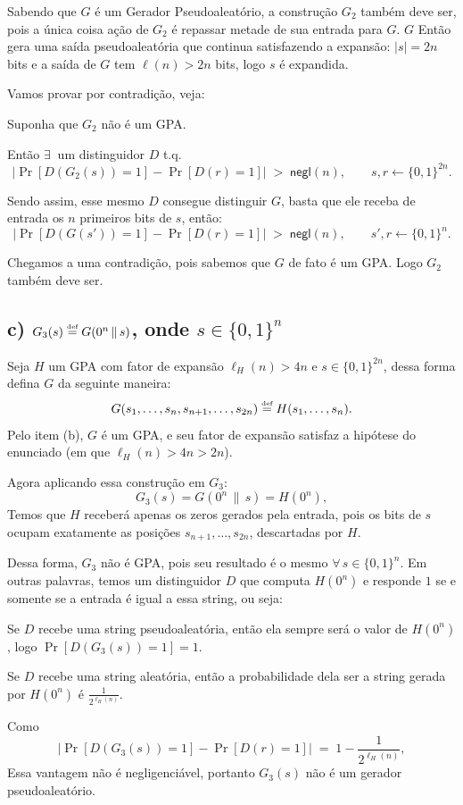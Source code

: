 \documentclass[11pt,a4paper]{article}
\newcommand{\negl}{\mathsf{negl}}
\newcommand{\defeq}{\stackrel{\text{\tiny def}}{=}}
\begin{document}
Sabendo que $G$ é um Gerador Pseudoaleatório, a construção $G_2$ também deve ser, pois a única
coisa ação de $G_2$ é repassar metade de sua entrada para $G$. $G$ Então gera uma saída pseudoaleatória
que continua satisfazendo a expansão: $|s| = 2n$ bits e a saída de $G$ tem $\ell(n) > 2n$ bits,
logo $s$ é expandida.

Vamos provar por contradição, veja:

Suponha que $G_2$ não é um GPA\@.

Então $\exists\ $ um distinguidor $D$ t.q.
\[
    \bigl|\Pr[D(G_2(s)) = 1] - \Pr[D(r) = 1]\bigr| \;>\; \negl(n),
    \qquad s, r \leftarrow \{0,1\}^{2n}.
\]

Sendo assim, esse mesmo $D$ consegue distinguir $G$, basta que ele receba de entrada
os $n$ primeiros bits de $s$, então:
\[
    \bigl|\Pr[D(G(s')) = 1] - \Pr[D(r) = 1]\bigr| \;>\; \negl(n),
    \qquad s', r \leftarrow \{0,1\}^{n}.
\]

Chegamos a uma contradição, pois sabemos que $G$ de fato é um GPA. Logo $G_2$ também deve ser.

\clearpage

\subsection*{c) $G_3(s) \defeq G(0^{n} \,\|\, s)$, onde
    $s \in \{0,1\}^{n}$}

Seja $H$ um GPA com fator de expansão $\ell_H(n) > 4n$ e $s \in \{0,1\}^{2n}$,
dessa forma defina $G$ da seguinte maneira:
\[
    G(s_1,\ldots,s_n,s_{n+1},\ldots,s_{2n}) \defeq H(s_1,\ldots,s_n).
\]
Pelo item (b), $G$ é um GPA, e seu fator de expansão satisfaz a hipótese do
enunciado (em que $\ell_H(n) > 4n > 2n$).

Agora aplicando essa construção em $G_3$:
\[
    G_3(s) = G(0^{n} \,\|\, s) = H(0^{n}),
\]
Temos que $H$ receberá apenas os zeros gerados pela entrada, 
pois os bits de $s$ ocupam exatamente as posições $s_{n+1},\ldots,s_{2n}$, descartadas por $H$.

Dessa forma, $G_3$ não é GPA, pois seu resultado é o mesmo
$\forall\, s \in \{0,1\}^{n}$. 
Em outras palavras, temos um distinguidor $D$ que computa $H(0^{n})$ e responde $1$ se e 
somente se a entrada é igual a essa string, ou seja:

Se $D$ recebe uma string pseudoaleatória, então ela sempre será o valor de
$H(0^{n})$, logo $\Pr[D(G_3(s)) = 1] = 1$.

Se $D$ recebe uma string aleatória, então a probabilidade dela ser a string
gerada por $H(0^{n})$ é $\frac{1}{2^{\ell_H(n)}}$.

Como
\[
    \bigl|\Pr[D(G_3(s)) = 1] - \Pr[D(r) = 1]\bigr|
    \;=\; 1 - \frac{1}{2^{\ell_H(n)}},
\]
Essa vantagem não é negligenciável, portanto $G_3(s)$ não é um gerador pseudoaleatório.
\end{document}
